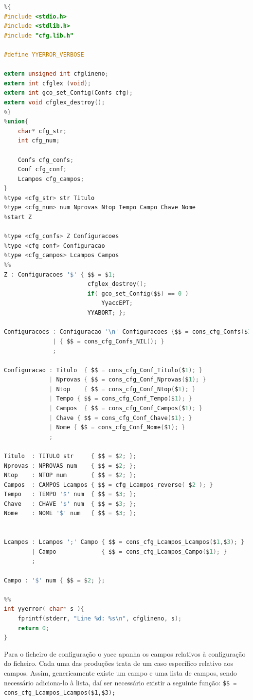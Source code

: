 \documentclass[11pt, a4paper, oneside]{article}
\begin{document}
\begin{lstlisting}[language=C, caption={Yacc do ficheiro de configuração.}]
%token TITULO NPROVAS NTOP CAMPOS TEMPO CHAVE NOME str num
%{
#include <stdio.h>
#include <stdlib.h>
#include "cfg.lib.h"

#define YYERROR_VERBOSE

extern unsigned int cfglineno;
extern int cfglex (void);
extern int gco_set_Config(Confs cfg);
extern void cfglex_destroy();
%}
%union{
    char* cfg_str;
    int cfg_num;
    
    Confs cfg_confs;
    Conf cfg_conf;
    Lcampos cfg_campos;
}
%type <cfg_str> str Titulo
%type <cfg_num> num Nprovas Ntop Tempo Campo Chave Nome
%start Z

%type <cfg_confs> Z Configuracoes
%type <cfg_conf> Configuracao
%type <cfg_campos> Lcampos Campos
%%
Z : Configuracoes '$' { $$ = $1;
                        cfglex_destroy();
                        if( gco_set_Config($$) == 0 )
                            YyaccEPT;
                        YYABORT; };

Configuracoes : Configuracao '\n' Configuracoes {$$ = cons_cfg_Confs($1,$3);}
              | { $$ = cons_cfg_Confs_NIL(); }
              ;

Configuracao : Titulo  { $$ = cons_cfg_Conf_Titulo($1); }
             | Nprovas { $$ = cons_cfg_Conf_Nprovas($1); }
             | Ntop    { $$ = cons_cfg_Conf_Ntop($1); }
             | Tempo { $$ = cons_cfg_Conf_Tempo($1); }
             | Campos  { $$ = cons_cfg_Conf_Campos($1); }
             | Chave { $$ = cons_cfg_Conf_Chave($1); }
             | Nome { $$ = cons_cfg_Conf_Nome($1); }
             ;

Titulo  : TITULO str     { $$ = $2; };
Nprovas : NPROVAS num    { $$ = $2; };
Ntop    : NTOP num       { $$ = $2; };
Campos  : CAMPOS Lcampos { $$ = cfg_Lcampos_reverse( $2 ); }
Tempo   : TEMPO '$' num  { $$ = $3; };
Chave   : CHAVE '$' num  { $$ = $3; };
Nome    : NOME '$' num   { $$ = $3; };


Lcampos : Lcampos ';' Campo { $$ = cons_cfg_Lcampos_Lcampos($1,$3); }
        | Campo             { $$ = cons_cfg_Lcampos_Campo($1); }
        ;

Campo : '$' num { $$ = $2; };

%%
int yyerror( char* s ){
    fprintf(stderr, "Line %d: %s\n", cfglineno, s);
    return 0;
}
\end{lstlisting} 

Para o ficheiro de configuração o \textsf{yacc} apanha os campos relativos à configuração do ficheiro. Cada uma das produções trata de um caso específico relativo aos campos. Assim, genericamente existe um campo e uma lista de campos, sendo necessário adiciona-lo à lista, daí ser necessário existir a seguinte função: \texttt{\$\$ = cons\_cfg\_Lcampos\_Lcampos(\$1,\$3); }
\end{document}
